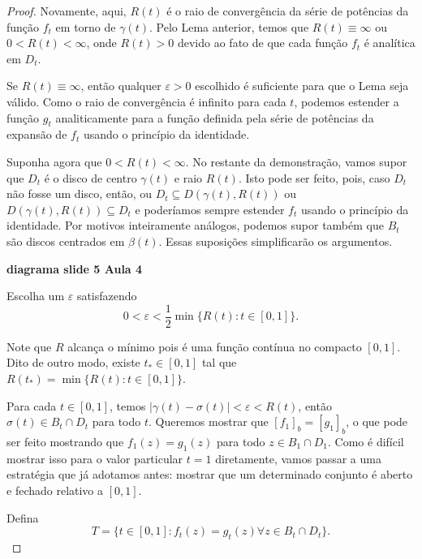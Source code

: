 \begin{proof}
Novamente, aqui, $R(t)$ é o raio de convergência da série de potências da função 
$f_t$ em torno de $\gamma(t)$. Pelo Lema anterior, temos que $R(t) \equiv \infty$ 
ou $0 < R(t) < \infty$, onde $R(t) > 0$ devido ao fato de que cada função $f_t$ é
analítica em $D_t$. 

Se $R(t) \equiv \infty$, então qualquer $\varepsilon > 0$ escolhido é suficiente 
para que o Lema seja válido. Como o raio de convergência é infinito para cada $t$,
podemos estender a função $g_t$ analiticamente para a função definida pela série de
potências da expansão de $f_t$ usando o princípio da identidade.

Suponha agora que $0 < R(t) < \infty$. No restante da demonstração, vamos supor que 
$D_t$ é o disco de centro $\gamma(t)$ e raio $R(t)$. Isto pode ser feito, pois, caso
$D_t$ não fosse um disco, então, ou $D_t \subseteq D(\gamma(t),R(t))$ ou
$D(\gamma(t),R(t)) \subseteq D_t$ e poderíamos sempre estender $f_t$ usando o 
princípio da identidade. Por motivos inteiramente análogos, podemos supor também
que $B_t$ são discos centrados em $\beta(t)$. Essas suposições simplificarão 
os argumentos.

\begin{center}
    \textbf{diagrama slide 5 Aula 4}
\end{center}

Escolha um $\varepsilon$ satisfazendo
\begin{equation*}
0 < \varepsilon < \frac{1}{2}\min\{R(t): t \in [0,1]\}.
\end{equation*}

Note que $R$ alcança o mínimo pois é uma função contínua no compacto $[0,1]$. 
Dito de outro modo, existe $t_* \in [0,1]$ tal que $R(t_*) = \min\{R(t): t \in [0,1]\}$.

Para cada $t \in [0,1]$, temos $|\gamma(t) - \sigma(t)| < \varepsilon < R(t)$, então
$\sigma(t) \in B_t \cap D_t$ para todo $t$. Queremos mostrar que $[f_1]_b = [g_1]_b$, 
o que pode ser feito mostrando que $f_1(z) = g_1(z)$ para todo $z \in B_1 \cap D_1$. 
Como é difícil mostrar isso para o valor particular $t=1$ diretamente, vamos passar 
a uma estratégia que já adotamos antes: mostrar que um determinado conjunto é aberto
e fechado relativo a $[0,1]$.

Defina
\begin{equation*}
T = \{t \in [0,1]: f_t(z) = g_t(z) \forall z \in B_t \cap D_t\}.
\end{equation*}


\end{proof}
